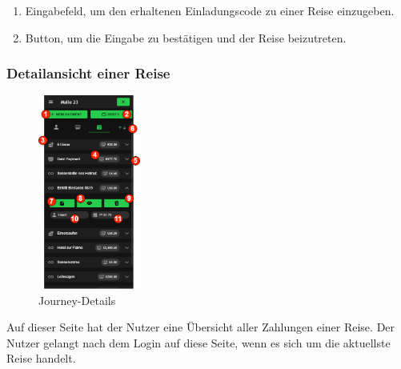 \begin{enumerate}[label=\protect\circled{\arabic*}]
	\item Eingabefeld, um den erhaltenen Einladungscode zu einer Reise einzugeben.
	\item Button, um die Eingabe zu bestätigen und der Reise beizutreten.
\end{enumerate}

\subsubsection{Detailansicht einer Reise}\label{Journey-Details}
\begin{figure}[H]
	\centering
	\includegraphics[width=0.3\textwidth]{img/pages_numbers/journey-details.drawio}
	\caption[Journey-Details]{Journey-Details}
	\label{fig:Journey-Details}
\end{figure}

Auf dieser Seite hat der Nutzer eine Übersicht aller Zahlungen einer Reise.
Der Nutzer gelangt nach dem Login auf diese Seite, wenn es sich um die aktuellste Reise handelt.

